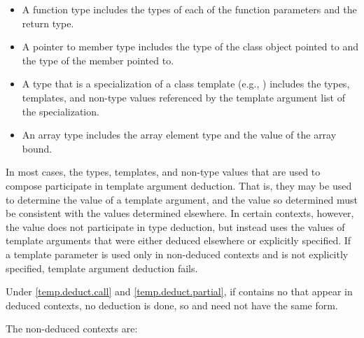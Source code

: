 \begin{itemize}
\item
A function type includes the types of each of the function parameters
and the return type.
\item
A pointer to member type includes the type of the class object pointed to
and the type of the member pointed to.
\item
A type that is a specialization of a class template (e.g.,
)
includes the types, templates, and non-type values referenced by the
template argument list of the specialization.
\item
An array type includes the array element type and the value of the
array bound.
\end{itemize}

\pnum
In most cases, the types, templates, and non-type values that are used
to compose
participate in template argument deduction.
That is,
they may be used to determine the value of a template argument, and
the value so determined must be consistent with the values determined
elsewhere.
In certain contexts, however, the value does not
participate in type deduction, but instead uses the values of template
arguments that were either deduced elsewhere or explicitly specified.
If a template parameter is used only in non-deduced contexts and is not
explicitly specified, template argument deduction fails.
\begin{note}
Under \ref{temp.deduct.call} and \ref{temp.deduct.partial},
if  contains no  that appear
in deduced contexts, no deduction is done, so  and 
need not have the same form.
\end{note}

\pnum
The non-deduced contexts are:

